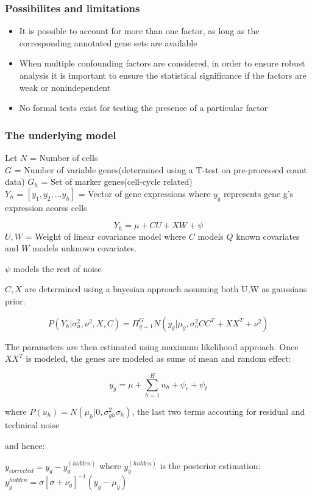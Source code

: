 \documentclass[10pt, compress]{beamer}
\renewcommand{\(}{\begin{columns}}
\renewcommand{\)}{\end{columns}}
\newcommand{\<}[1]{\begin{column}{#1}}
\renewcommand{\>}{\end{column}}
\begin{document}
\begin{frame}
\frametitle{Possibilites and limitations}
\begin{itemize}[<+- | alert@+>]
\item It is possible to account for more than one factor, as long as the corresponding annotated gene sets are available
\item When multiple confounding factors are considered, in order to ensure robust analysis it is important to ensure
the statistical significance if the factors are weak or nonindependent
\item No formal tests exist for testing the presence of a particular factor

\end{itemize}
\end{frame}


\begin{frame}%
\frametitle{The underlying model}
Let $N$ = Number of cells \\
$G$ = Number of variable genes(determined using a T-test on pre-processed count data)
$G_h$ = Set of marker genes(cell-cycle related) \\
$Y_h$ = $[y_1, y_2, ... y_h]$ = Vector of gene expressions  where $y_g$ represents gene g's expression acorss cells

\begin{equation}
Y_h = \mu + CU + XW + \psi
\end{equation}
$U,W$ = Weight of linear covariance model where $C$ models $Q$ known covariates and $W$ models unknown covariates.

$\psi$ models the rest of noise

$C,X$ are determined using a bayesian approach assuming both U,W as gaussians prior.

\end{frame}

\begin{frame}%

\begin{equation}
P(Y_h|\sigma_u^2, \nu^2, X, C) = \Pi_{g=1}^{G} N(y_g|\mu_g, {\sigma_u^2CC^T+XX^T+\nu^2} )
\end{equation}

The parameters are then estimated using maximum likelihood approach. Once $XX^T$ is modeled, the genes are modeled
as sume of mean and random effect:

\begin{equation}
y_g = \mu + \sum_{h=1}^Hu_h + \psi_e + \psi_t
\end{equation}

where $P(u_h)=N(\mu_h|0, \sigma_{gh}^2\sigma_h)$, the last two terms accouting for residual and technical noise

and hence:

$y_{corrected} = y_g - y_g^{(hidden)}$
where $y_g^{(hidden)}$ is the posterior estimation:
$y_g^{hidden} = \sigma[\sigma +\nu_g]^{-1}(y_g-\mu_g)$
\end{frame}
\end{document}
